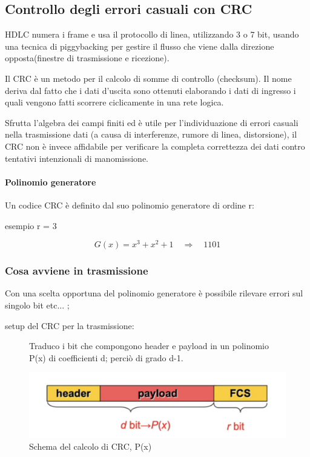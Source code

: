 \newpage

\subsection{Controllo degli errori casuali con CRC}

HDLC numera i frame e usa il protocollo di linea, utilizzando 3 o 7 bit, usando una tecnica di piggybacking per gestire il flusso che viene dalla direzione opposta(finestre di trasmissione e ricezione).

Il CRC è un metodo per il calcolo di somme di controllo (checksum). Il nome deriva dal fatto che i dati d'uscita sono ottenuti elaborando i dati di ingresso i quali vengono fatti scorrere ciclicamente in una rete logica.

Sfrutta l'algebra dei campi finiti ed è utile per l'individuazione di errori casuali nella trasmissione dati (a causa di interferenze, rumore di linea, distorsione), il CRC non è invece affidabile per verificare la completa correttezza dei dati contro tentativi intenzionali di manomissione.
\paragraph{Polinomio generatore}
Un codice CRC è definito dal suo polinomio generatore di ordine r:

esempio r = 3

\begin{equation}
    G(x) = x^3 + x^2 + 1 \quad \Rightarrow \quad 1101
\end{equation}

\subsubsection{Cosa avviene in trasmissione}
 Con una scelta opportuna del polinomio generatore è possibile rilevare errori sul singolo bit etc... ;

 setup del CRC per la trasmissione:

\begin{figure}[htbp]
    \centering
    \begin{minipage}{0.45\textwidth}
        Traduco i bit che compongono header e payload in un polinomio P(x) di coefficienti d; perciò di grado d-1.
    \end{minipage}%
    \hfill
    \begin{minipage}{0.5\textwidth}
        \includegraphics[width=\linewidth]{images/crctrasmissione.png}
        \caption{Schema del calcolo di CRC, P(x)}
    \end{minipage}
\end{figure}

